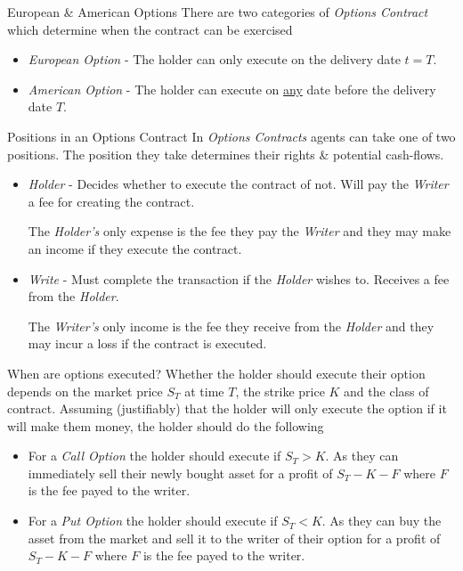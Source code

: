 \documentclass[11pt,a4paper]{article}
\begin{document}
  \begin{definition}{European \& American Options}
    There are two categories of \textit{Options Contract} which determine when the contract can be exercised
    \begin{itemize}
      \item \textit{European Option} - The holder can only execute on the delivery date $t=T$.
      \item \textit{American Option} - The holder can execute on \underline{any} date before the delivery date $T$.
    \end{itemize}
  \end{definition}

  \begin{definition}{Positions in an Options Contract}
    In \textit{Options Contracts} agents can take one of two positions. The position they take determines their rights \& potential cash-flows.
    \begin{itemize}
      \item \textit{Holder} - Decides whether to execute the contract of not. Will pay the \textit{Writer} a fee for creating the contract.
      \par The \textit{Holder's} only expense is the fee they pay the \textit{Writer} and they may make an income if they execute the contract.
      \item \textit{Write} - Must complete the transaction if the \textit{Holder} wishes to. Receives a fee from the \textit{Holder}.
      \par The \textit{Writer's} only income is the fee they receive from the \textit{Holder} and they may incur a loss if the contract is executed.
    \end{itemize}
  \end{definition}

  \begin{remark}{When are options executed?}
    Whether the holder should execute their option depends on the market price $S_T$ at time $T$, the strike price $K$ and the class of contract. Assuming (justifiably) that the holder will only execute the option if it will make them money, the holder should do the following
    \begin{itemize}
      \item For a \textit{Call Option} the holder should execute if $S_T>K$. As they can immediately sell their newly bought asset for a profit of $S_T-K-F$ where $F$ is the fee payed to the writer.
      \item For a \textit{Put Option} the holder should execute if $S_T<K$. As they can buy the asset from the market and sell it to the writer of their option for a profit of $S_T-K-F$ where $F$ is the fee payed to the writer.
    \end{itemize}
  \end{remark}
\end{document}
